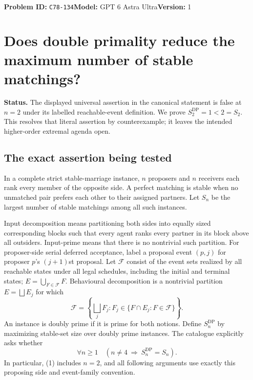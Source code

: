 \documentclass[11pt,a4paper]{article}
\begin{document}
\noindent\textbf{Problem ID:} \texttt{C78-134}\quad\textbf{Model:} GPT 6 Astra Ultra\quad\textbf{Version:} 1\par
\section*{Does double primality reduce the maximum number of stable matchings?}

\textbf{Status.} The displayed universal assertion in the canonical statement is false at $n=2$ under its labelled reachable-event definition. We prove $S_2^{\mathrm{DP}}=1<2=S_2$. This resolves that literal assertion by counterexample; it leaves the intended higher-order extremal agenda open.

\subsection*{The exact assertion being tested}
In a complete strict stable-marriage instance, $n$ proposers and $n$ receivers each rank every member of the opposite side. A perfect matching is stable when no unmatched pair prefers each other to their assigned partners. Let $S_n$ be the largest number of stable matchings among all such instances.

Input decomposition means partitioning both sides into equally sized corresponding blocks such that every agent ranks every partner in its block above all outsiders. Input-prime means that there is no nontrivial such partition. For proposer-side serial deferred acceptance, label a proposal event $(p,j)$ for proposer $p$'s $(j+1)$st proposal. Let $\mathcal F$ consist of the event sets realized by all reachable states under all legal schedules, including the initial and terminal states; $E=\bigcup_{F\in\mathcal F}F$. Behavioural decomposition is a nontrivial partition $E=\bigsqcup E_j$ for which
\[
 \mathcal F=\left\{\bigsqcup_jF_j:
                  F_j\in\{F\cap E_j:F\in\mathcal F\}\right\}.
\]
An instance is doubly prime if it is prime for both notions. Define $S_n^{\mathrm{DP}}$ by maximizing stable-set size over doubly prime instances. The catalogue explicitly asks whether
\[
 \forall n\geq1\quad(n\ne4\ \Longrightarrow\ S_n^{\mathrm{DP}}=S_n).\tag{1}
\]
In particular, (1) includes $n=2$, and all following arguments use exactly this proposing side and event-family convention.
\end{document}
